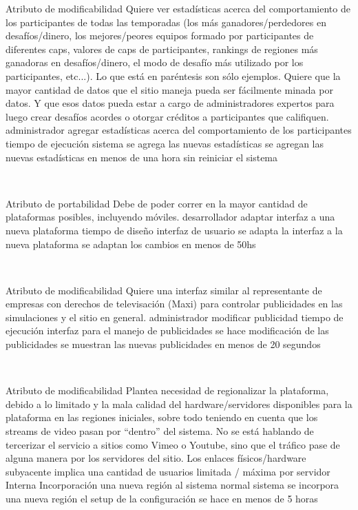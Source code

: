 \escenario
{Atributo de modificabilidad}
{Quiere ver estadísticas acerca del comportamiento de los participantes de todas las
temporadas (los más ganadores/perdedores en desafíos/dinero, los mejores/peores
equipos formado por participantes de diferentes caps, valores de caps de participantes,
rankings de regiones más ganadoras en desafíos/dinero, el modo de desafío más utilizado
por los participantes, etc...). Lo que está en paréntesis son sólo ejemplos. Quiere que la
mayor cantidad de datos que el sitio maneja pueda ser fácilmente minada por datos. Y
que esos datos pueda estar a cargo de administradores expertos para luego crear
desafíos acordes o otorgar créditos a participantes que califiquen.}
{administrador}
{agregar estadísticas acerca del comportamiento de los participantes}
{tiempo de ejecución}
{sistema}
{se agrega las nuevas estadísticas}
{se agregan las nuevas estadísticas en menos de una hora sin reiniciar el sistema}

~

\escenario
{Atributo de portabilidad}
{Debe de poder correr en la mayor cantidad de plataformas posibles, incluyendo móviles.}
{desarrollador}
{adaptar interfaz a una nueva plataforma}
{tiempo de diseño}
{interfaz de usuario}
{se adapta la interfaz a la nueva plataforma}
{se adaptan los cambios en menos de 50hs}

~

\escenario
{Atributo de modificabilidad}
{Quiere una interfaz similar al representante de empresas con derechos de televisación (Maxi) para controlar publicidades en las simulaciones y el sitio en general.}
{administrador}
{modificar publicidad}
{tiempo de ejecución}
{interfaz para el manejo de publicidades}
{se hace modificación de las publicidades}
{se muestran las nuevas publicidades en menos de 20 segundos}

~

\escenario
{Atributo de modificabilidad}
{Plantea necesidad de regionalizar la plataforma, debido a lo limitado y la mala calidad del
hardware/servidores disponibles para la plataforma en las regiones iniciales, sobre todo
teniendo en cuenta que los streams de video pasan por “dentro” del sistema. No se está
hablando de tercerizar el servicio a sitios como Vimeo o Youtube, sino que el tráfico pase
de alguna manera por los servidores del sitio. Los enlaces físicos/hardware subyacente
implica una cantidad de usuarios limitada / máxima por servidor}
{Interna}
{Incorporación una nueva región al sistema}
{normal}
{sistema}
{se incorpora una nueva región}
{el setup de la configuración se hace en menos de 5 horas}

